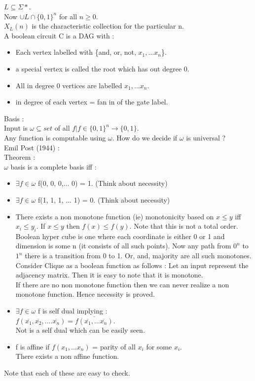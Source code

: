 \documentclass[solution,addpoints,12pt]{exam}
\begin{document}
$L \subseteq \Sigma*$.\\
Now $\cup L \cap {\{ 0, 1\}}^n$ for all $n \ge 0$.\\
$X_L(n)$ is the characteristic collection for the particular n.\\

A boolean circuit C is a DAG with :
\begin{itemize}
\item Each vertex labelled with \{and, or, not, $x_1, ... x_n$\}.
\item a special vertex is called the root which has out degree 0.
\item All in degree 0 vertices are labelled $x_1, ... x_n$.
\item in degree of each vertex = fan in of the gate label.
\end{itemize}
Basis :\\
Input is $\omega \subseteq set $ of all $f | f \in {\{0, 1\}}^n \rightarrow
\{0, 1\}$.\\
Any function is computable using $\omega$.
How do we decide if $\omega$ is universal ?\\
Emil Post (1944) :\\
Theorem :\\
$\omega$ basis is a complete basis iff :\\
\begin{itemize}
\item $\exists f \in \omega$ f(0, 0, 0,... 0) = 1. (Think about necessity)
\item $\exists f \in \omega$ f(1, 1, 1, ... 1) = 0. (Think about necessity)
\item There exists a non monotone function (ie) monotonicity
based on $x \le y$ iff $x_i \le y_i$. If $x \le y$ then $f(x) \le f(y)$.
Note that this is not a total order. Boolean hyper cube is
one where each coordinate is either 0 or 1 and dimension is
some n (it consists of all such points). Now any path from
$0^n$ to $1^n$ there is a transition from 0 to 1. Or, and, majority
are all such monotones.\\
Consider Clique as a boolean function as follows : Let an input
represent the adjacency matrix. Then it is easy to note that
it is monotone.\\

If there are no non monotone function then we can never realize
a non monotone function. Hence necessity is proved.
\item $\exists f \in \omega$ f is self dual implying :\\
$f (\overline{x_1}, \overline{x_2}, .... \overline{x_n}) =
\overline {f(\overline{x_1}, ... \overline{x_n})}$.\\
Not is a self dual which can be easily seen.
\item f is affine if $f(x_1, ... x_n)$ = parity of all $x_i$ for
some $x_i$.\\
There exists a non affine function.
\end{itemize}
Note that each of these are easy to check.\\
\end{document}
